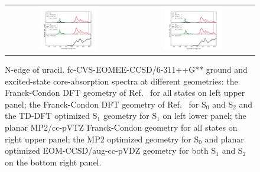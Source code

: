 \documentclass[journal=jctcce,manuscript=article]{achemso}
\begin{document}
\begin{figure}[H]
\caption{N-edge of uracil. fc-CVS-EOMEE-CCSD/6-311++G** ground and excited-state core-absorption spectra at different geometries: 
the Franck-Condon DFT geometry of Ref.~ for all states
on left upper panel; the Franck-Condon DFT geometry of Ref.~  for S$_0$ and S$_2$ and the TD-DFT 
optimized S$_1$ geometry for S$_1$ on left lower panel;  
the planar MP2/cc-pVTZ Franck-Condon geometry for all states
on right upper panel; the MP2 optimized geometry for S$_0$ and
planar optimized EOM-CCSD/aug-cc-pVDZ geometry for both S$_1$ and S$_2$ 
on the bottom right panel.
\label{fgr:uracil:trnexafs_uracil_n}}
\begin{tabular}{cc}
\hspace{-3mm}
\includegraphics[width=0.5\textwidth]{Spectra/DFT_Uracil_Sn_N_zoom.pdf} 
&
\includegraphics[width=0.5\textwidth]{Spectra/MP2_Uracil_Sn_N_zoom.pdf}
\\
\end{tabular}
\end{figure}


\end{document}
